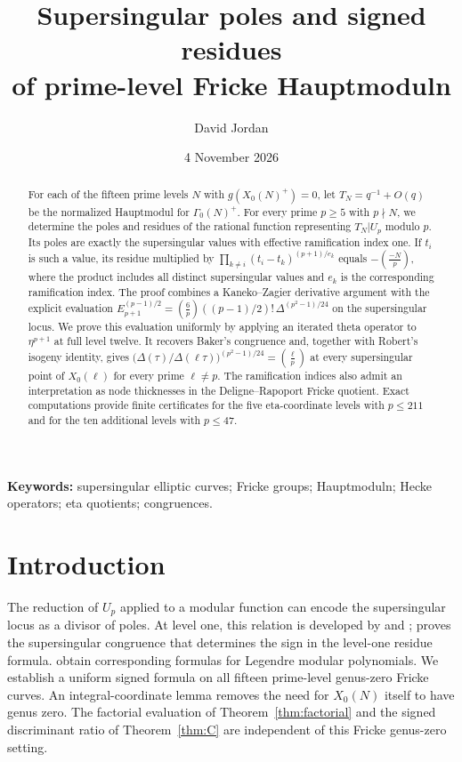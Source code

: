 \documentclass[11pt,a4paper]{article}
\title{Supersingular poles and signed residues\\of prime-level Fricke Hauptmoduln}
\author{David Jordan}
\date{4 November 2026}
\numberwithin{equation}{section}
\theoremstyle{definition}
\theoremstyle{remark}
\begin{document}
\maketitle
\begin{abstract}
For each of the fifteen prime levels $N$ with $g(X_0(N)^+)=0$,
let $T_N=q^{-1}+O(q)$ be the normalized Hauptmodul for
$\Gamma_0(N)^+$. For every prime $p\ge5$ with $p\nmid N$, we determine the poles and
residues of the rational function representing $T_N|U_p$ modulo $p$. Its poles are
exactly the supersingular values with effective ramification index one. If $t_i$ is
such a value, its residue multiplied by
$\prod_{k\ne i}(t_i-t_k)^{(p+1)/e_k}$ equals $-\left(\frac{-N}{p}\right)$, where the
product includes all distinct supersingular values and $e_k$ is the corresponding
ramification index. The proof combines a Kaneko--Zagier derivative argument with
the explicit evaluation
$E_{p+1}^{(p-1)/2}=\left(\frac6p\right)((p-1)/2)!\,\Delta^{(p^2-1)/24}$
on the supersingular locus. We prove this evaluation uniformly by applying an
iterated theta operator to $\eta^{p+1}$ at full level twelve. It recovers Baker's
congruence and, together with Robert's isogeny identity, gives
$\bigl(\Delta(\tau)/\Delta(\ell\tau)\bigr)^{(p^2-1)/24}=\left(\frac{\ell}{p}\right)$
at every supersingular point of $X_0(\ell)$ for every prime $\ell\ne p$.
The ramification indices also admit an interpretation as node thicknesses in the
Deligne--Rapoport Fricke quotient. Exact computations provide finite certificates
for the five eta-coordinate levels with $p\le211$ and for the ten
additional levels with $p\le47$.
\end{abstract}
\noindent\textbf{Keywords:} supersingular elliptic curves; Fricke groups; Hauptmoduln; Hecke operators; eta quotients; congruences.

\section{Introduction}\label{sec:intro}
The reduction of $U_p$ applied to a modular function can encode the supersingular
locus as a divisor of poles. At level one, this relation is developed by \citet{dS94} and \citet[\S10]{KZ98}; \citet{Baker98} proves the
supersingular congruence that determines the sign in the level-one residue formula.
\citet{BL18} obtain corresponding formulas for Legendre modular
polynomials. We establish a uniform signed formula on all fifteen
prime-level genus-zero Fricke curves. An integral-coordinate lemma
removes the need for $X_0(N)$ itself to have genus zero. The factorial evaluation
of Theorem~\ref{thm:factorial} and the signed discriminant ratio of
Theorem~\ref{thm:C} are independent of this Fricke genus-zero setting.
\end{document}
